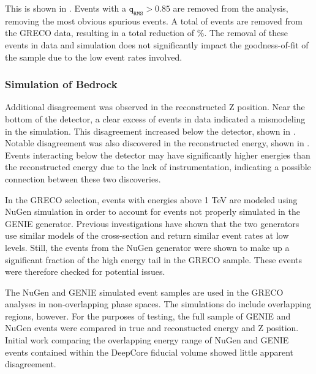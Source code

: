 This is shown in .
Events with a $\mathtt{q_{RMS}}>0.85$ are removed from the analysis, removing the most obvious spurious events. 
A total of  events are removed from the GRECO data, resulting in a total reduction of \%.
The removal of these events in data and simulation does not significantly impact the goodness-of-fit of the sample due to the low event rates involved.

\label{subsubsec:bedrock}
\subsubsection{Simulation of Bedrock}
Additional disagreement was observed in the reconstructed Z position.
Near the bottom of the detector, a clear excess of events in data indicated a mismodeling in the simulation.
This disagreement increased below the detector, shown in .
Notable disagreement was also discovered in the reconstructed energy, shown in .
Events interacting below the detector may have significantly higher energies than the reconstructed energy due to the lack of instrumentation, indicating a possible connection between these two discoveries.

In the GRECO selection, events with energies above 1 TeV are modeled using NuGen simulation in order to account for events not properly simulated in the GENIE generator.
Previous investigations have shown that the two generators use similar models of the cross-section and return similar event rates at low levels.
Still, the events from the NuGen generator were shown to make up a significant fraction of the high energy tail in the GRECO sample.
These events were therefore checked for potential issues.

The NuGen and GENIE simulated event samples are used in the GRECO analyses in non-overlapping phase spaces.
The simulations do include overlapping regions, however.
For the purposes of testing, the full sample of GENIE and NuGen events were compared in true and reconstucted energy and Z position.
Initial work comparing the overlapping energy range of NuGen and GENIE events contained within the DeepCore fiducial volume showed little apparent disagreement.

